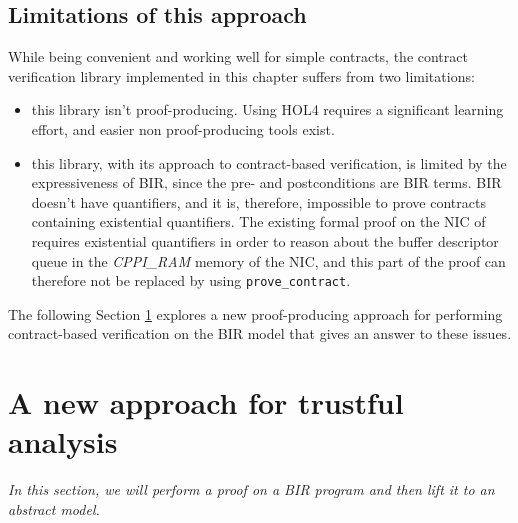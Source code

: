 \documentclass[10pt,a4paper]{article}
\begin{document}
\begin{multicols}{2}
\subsection{Limitations of this approach}

While being convenient and working well for simple contracts, the contract verification library implemented in this chapter suffers from two limitations:

\begin{itemize}
  \item this library isn't {proof-producing}. Using HOL4 requires a significant learning effort, and easier non proof-producing tools exist.
	\item this library, with its approach to contract-based verification, is limited by the expressiveness of BIR, since the pre- and postconditions are BIR terms. BIR doesn't have quantifiers, and it is, therefore, impossible to prove contracts containing existential quantifiers. The existing formal proof on the NIC of \cite{haglund_formal_2016} requires existential quantifiers in order to reason about the buffer descriptor queue in the \textit{CPPI\_RAM} memory of the NIC, and this part of the proof can therefore not be replaced by using \texttt{prove\_contract}.
\end{itemize}

The following Section \ref{trustful-nic-analysis} explores a new proof-producing approach for performing contract-based verification on the BIR model that gives an answer to these issues.


\section{A new approach for trustful analysis} \label{trustful-nic-analysis}
\textit{In this section, we will perform a proof on a BIR program and then lift it to an abstract model.}
\medskip


\end{multicols}
\end{document}
